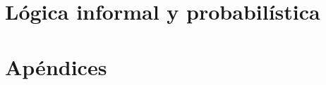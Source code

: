 \documentclass[12pt,letterpaper,twoside]{book} %
\theoremstyle{plain}
\theoremstyle{remark}				%
\begin{document}
\part{Lógica informal y probabilística}
 


\backmatter


\part*{Apéndices}



{}
\renewcommand\indexname{Índice analítico}
\printindex



\end{document}
